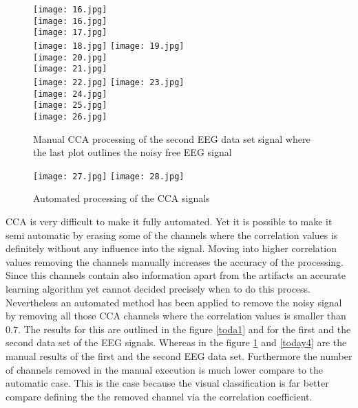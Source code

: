 \begin{figure}[!htbp]
%
\centering
\texttt{[image: 16.jpg]}\\
\texttt{[image: 16.jpg]}\\
\texttt{[image: 17.jpg]}\\
\texttt{[image: 18.jpg]}
\endminipage\hfill
{}%
\centering
\texttt{[image: 19.jpg]}\\
\texttt{[image: 20.jpg]}\\
\texttt{[image: 21.jpg]}\\
\texttt{[image: 22.jpg]}
\endminipage\hfill
{}%
\centering
\texttt{[image: 23.jpg]}\\
\texttt{[image: 24.jpg]}\\
\texttt{[image: 25.jpg]}\\
\texttt{[image: 26.jpg]}
\endminipage\hfill
\caption{Manual CCA processing of the second EEG data set signal where the last plot outlines the noisy free EEG signal}\label{today3}
\end{figure}


\begin{figure}[!htbp]
%
\centering
\texttt{[image: 27.jpg]}
\label{toda1}
\endminipage\hfill
{}%
\centering
\texttt{[image: 28.jpg]}
\label{toda2}
\endminipage\hfill
\caption{Automated processing of the CCA signals}
\end{figure}

CCA is very difficult to make it fully automated. Yet it is possible to make it semi automatic by erasing some of the channels where the correlation values is definitely without any influence into the signal. Moving into higher correlation values removing the channels manually increases the accuracy of the processing. Since this channels contain also information apart from the artifacts an accurate learning algorithm yet cannot decided precisely when to do this process. Nevertheless an automated method has been applied to remove the noisy signal by removing all those CCA channels where the correlation values is smaller than $0.7$. The results for this are outlined in the figure \ref{toda1} and \label{toda2} for the first and the second data set of the EEG signals. Whereas in the figure \ref{today3} and \ref{today4} are the manual results of the first and the second EEG data set. Furthermore the number of channels removed in the manual execution is much lower compare to the automatic case. This is the case because the visual classification is far better compare defining the the removed channel via the correlation coefficient.  

